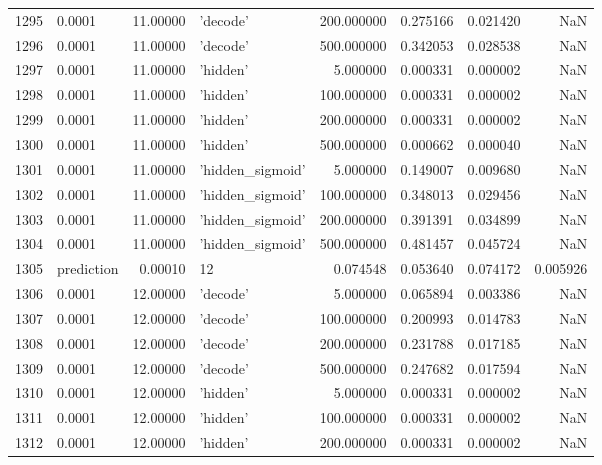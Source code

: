 \documentclass[10pt,a4paper]{article}
\begin{document}
\begin{tabular}{llrlrrrr}
1295 &      0.0001 &  11.00000 &           'decode' &  200.000000 &  0.275166 &  0.021420 &       NaN \\
1296 &      0.0001 &  11.00000 &           'decode' &  500.000000 &  0.342053 &  0.028538 &       NaN \\
1297 &      0.0001 &  11.00000 &           'hidden' &    5.000000 &  0.000331 &  0.000002 &       NaN \\
1298 &      0.0001 &  11.00000 &           'hidden' &  100.000000 &  0.000331 &  0.000002 &       NaN \\
1299 &      0.0001 &  11.00000 &           'hidden' &  200.000000 &  0.000331 &  0.000002 &       NaN \\
1300 &      0.0001 &  11.00000 &           'hidden' &  500.000000 &  0.000662 &  0.000040 &       NaN \\
1301 &      0.0001 &  11.00000 &   'hidden\_sigmoid' &    5.000000 &  0.149007 &  0.009680 &       NaN \\
1302 &      0.0001 &  11.00000 &   'hidden\_sigmoid' &  100.000000 &  0.348013 &  0.029456 &       NaN \\
1303 &      0.0001 &  11.00000 &   'hidden\_sigmoid' &  200.000000 &  0.391391 &  0.034899 &       NaN \\
1304 &      0.0001 &  11.00000 &   'hidden\_sigmoid' &  500.000000 &  0.481457 &  0.045724 &       NaN \\
1305 &  prediction &   0.00010 &                 12 &    0.074548 &  0.053640 &  0.074172 &  0.005926 \\
1306 &      0.0001 &  12.00000 &           'decode' &    5.000000 &  0.065894 &  0.003386 &       NaN \\
1307 &      0.0001 &  12.00000 &           'decode' &  100.000000 &  0.200993 &  0.014783 &       NaN \\
1308 &      0.0001 &  12.00000 &           'decode' &  200.000000 &  0.231788 &  0.017185 &       NaN \\
1309 &      0.0001 &  12.00000 &           'decode' &  500.000000 &  0.247682 &  0.017594 &       NaN \\
1310 &      0.0001 &  12.00000 &           'hidden' &    5.000000 &  0.000331 &  0.000002 &       NaN \\
1311 &      0.0001 &  12.00000 &           'hidden' &  100.000000 &  0.000331 &  0.000002 &       NaN \\
1312 &      0.0001 &  12.00000 &           'hidden' &  200.000000 &  0.000331 &  0.000002 &       NaN \\

\end{tabular}
\end{document}
